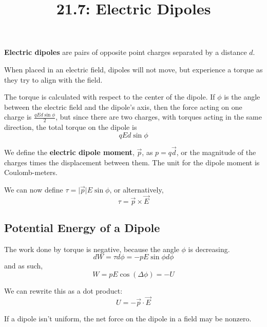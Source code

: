 \documentclass{article}
\title{21.7: Electric Dipoles}
\begin{document}
\maketitle

\begin{definition}
    \textbf{Electric dipoles} are pairs of opposite point charges separated by a distance $d$.
\end{definition}

When placed in an electric field, dipoles will not move, but experience a torque as they try to align with the field. 

The torque is calculated with respect to the center of the dipole. If $\phi$ is the angle between the electric field and the dipole's axis, then the force acting on one charge is $\frac{qEd\sin\phi}{2}$, but since there are two charges, with torques acting in the same direction, the total torque on the dipole is $$qEd\sin\phi$$

\begin{definition}
We define the \textbf{electric dipole moment}, $\vec{p}$, as $p = q\vec{d}$, or the magnitude of the charges times the displacement between them. The unit for the dipole moment is Coulomb-meters.  
\end{definition}

We can now define $\tau = \vert \vec{p}\vert E\sin\phi$, or alternatively, $$\tau = \vec{p}\times \vec{E}$$

\subsection{Potential Energy of a Dipole}
The work done by torque is negative, because the angle $\phi$ is decreasing.
$$dW = \tau d\phi = -pE\sin\phi d\phi$$and as such, $$W = pE\cos (\Delta\phi) = -U$$

We can rewrite this as a dot product: $$U = -\vec{p} \cdot \vec{E}$$

If a dipole isn't uniform, the net force on the dipole in a field may be nonzero. 
\end{document}
